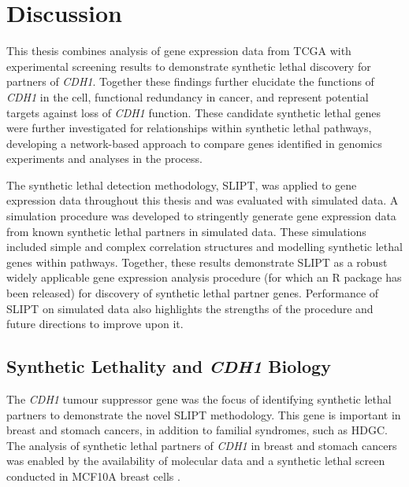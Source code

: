 \chapter{Discussion}
\label{chap:discussion}

This thesis combines analysis of \gls{gene expression} data from \gls{TCGA} with experimental screening results \citep{Telford2015} to demonstrate \gls{synthetic lethal} discovery for partners of \textit{CDH1}. %
Together these findings further elucidate the functions of \textit{CDH1} in the cell, \gls{functional redundancy} in cancer, and represent potential targets against loss of \textit{CDH1} function. These candidate \gls{synthetic lethal} genes were further investigated for relationships within \gls{synthetic lethal} pathways, developing a network-based approach to compare genes identified in \glspl{genomic} experiments and analyses in the process.

The \gls{synthetic lethal} detection methodology, \gls{SLIPT}, was applied to \gls{gene expression} data throughout this thesis and was evaluated with simulated data. A simulation procedure was developed to stringently generate \gls{gene expression} data from known \gls{synthetic lethal} partners in simulated data. These simulations included simple and complex correlation structures and modelling \gls{synthetic lethal} genes within pathways. Together, these results demonstrate \gls{SLIPT} as a robust widely applicable \gls{gene expression} analysis procedure (for which an R package has been released) for discovery of \gls{synthetic lethal} partner genes. Performance of \gls{SLIPT} on simulated data also highlights the strengths of the procedure and future directions to improve upon it.

\section{Synthetic Lethality and \textit{CDH1} Biology}
\label{chapt6:implications}

The \textit{CDH1} \gls{tumour suppressor} gene was the focus of identifying \gls{synthetic lethal} partners to demonstrate the novel \gls{SLIPT} methodology. This gene is important in  breast and stomach cancers, in addition to \gls{familial} syndromes, such as \gls{HDGC}. The analysis of \gls{synthetic lethal} partners of \textit{CDH1} in breast and stomach cancers was enabled by the availability of molecular data \citep{TCGA2012, TCGA2014GC} and a \gls{synthetic lethal} screen conducted in MCF10A breast cells \citep{Chen2014, Telford2015}.

